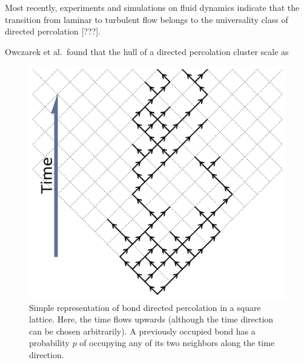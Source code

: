 Most recently, experiments and simulations on fluid dynamics indicate
that the transition from laminar to turbulent flow belongs to the
universality class of directed percolation [???].

Owczarek et al.\ found that the hull of a directed percolation cluster
scale as


\begin{figure}
\begin{center}
    \includegraphics[scale=0.5]{chapters/ch5-anis/figs/dperco_scheme}
\end{center}
\caption{Simple representation of bond directed percolation in a square
    lattice. Here, the time flows upwards (although the time direction can be
    chosen arbitrarily). A previously occupied bond has a probability $p$ of
    occupying any of its two neighbors along the time direction.}
\label{fig:dperco_scheme}
\end{figure}

